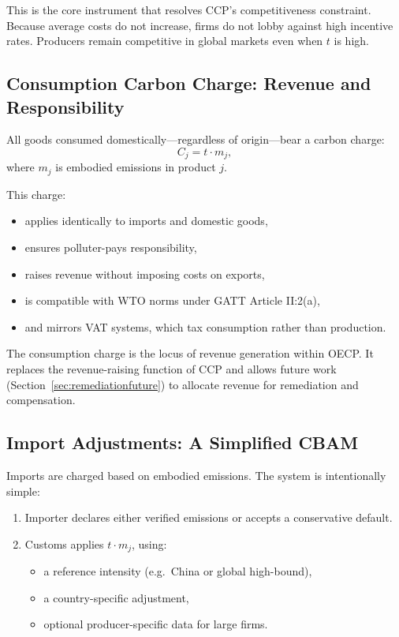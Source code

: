 \documentclass[12pt]{article}
\begin{document}
This is the core instrument that resolves CCP’s competitiveness constraint.
Because average costs do not increase, firms do not lobby against high incentive rates.
Producers remain competitive in global markets even when $t$ is high.

\subsection{Consumption Carbon Charge: Revenue and Responsibility}

All goods consumed domestically—regardless of origin—bear a carbon charge:
\[
C_j = t \cdot m_j,
\]
where $m_j$ is embodied emissions in product $j$.  

This charge:
\begin{itemize}
    \item applies identically to imports and domestic goods,
    \item ensures polluter-pays responsibility,
    \item raises revenue without imposing costs on exports,
    \item is compatible with WTO norms under GATT Article II:2(a),
    \item and mirrors VAT systems, which tax consumption rather than production.
\end{itemize}

The consumption charge is the locus of revenue generation within OECP.
It replaces the revenue-raising function of CCP and allows future work
(Section~\ref{sec:remediationfuture}) to allocate revenue for remediation and compensation.

\subsection{Import Adjustments: A Simplified CBAM}

Imports are charged based on embodied emissions.  
The system is intentionally simple:

\begin{enumerate}
    \item Importer declares either verified emissions or accepts a conservative default.
    \item Customs applies $t \cdot m_j$, using:
    \begin{itemize}
        \item a reference intensity (e.g.\ China or global high-bound),
        \item a country-specific adjustment,
        \item optional producer-specific data for large firms.
    \end{itemize}
\end{enumerate}
\end{document}
